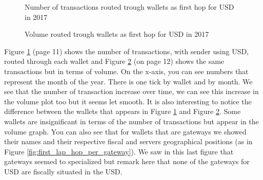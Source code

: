 \begin{figure}[h!]
  \caption{Number of transactions routed trough wallets as first hop for USD in 2017}
  \label{fig:first_hop_USD_nb_txns}
\end{figure}

\begin{figure}[h!]
  \caption{Volume routed trough wallets as first hop for USD in 2017}
  \label{fig:first_hop_USD_volume}
\end{figure}

Figure \ref{fig:first_hop_USD_nb_txns}  (page 11) shows the number of transactions, with sender using USD, routed through each wallet and Figure \ref{fig:first_hop_USD_volume}  (on page 12) shows the same transactions but in terms of volume. On the x-axis, you can see numbers that represent the month of the year. There is one tick by wallet and by month. We see that the number of transaction increase over time, we can see this increase in the volume plot too but it seems let smooth. It is also interesting to notice the difference between the wallets that appears in Figure \ref{fig:first_hop_USD_nb_txns} and Figure \ref{fig:first_hop_USD_volume}. Some wallets are insignificant in terms of the number of transactions but appear in the volume graph. You can also see that for wallets that are gateways we showed their names and their respective fiscal and servers geographical positions (as in Figure \ref{fig:first_lap_hop_per_gateway}). We saw in this last figure that gateways seemed to specialized but remark here that none of the gateways for USD are fiscally situated in the USD. 
\vspace{\baselineskip}

